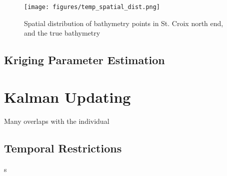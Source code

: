 \begin{figure}[h!]
    \centering
    \texttt{[image: figures/temp\_spatial\_dist.png]}
    \caption{Spatial distribution of bathymetry points in St. Croix north end, and the true bathymetry}
    \label{fig:distribution-of-bathy-points-in-space}
\end{figure}

\subsection{Kriging Parameter Estimation}


\section{Kalman Updating}
Many overlaps with the individual 
\subsection{Temporal Restrictions}
s
